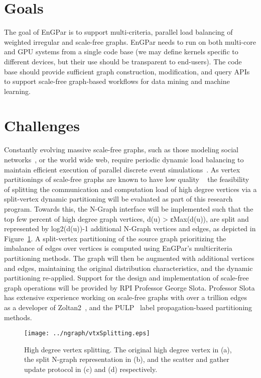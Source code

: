 \documentclass{article}
\begin{document}
\section{Goals}

The goal of EnGPar is to support multi-criteria, parallel
load balancing of weighted irregular and scale-free graphs.
EnGPar needs to run on both multi-core and GPU systems from a single code base
(we may define kernels specific to different devices, but their use should be
transparent to end-users).
The code base should provide sufficient graph construction, modification, and
query APIs to support scale-free graph-based workflows for data mining and
machine learning.

\section{Challenges}

Constantly evolving massive scale-free graphs, such as those modeling social
networks~\cite{twitter2010,kwak2010twitter}, or the world wide web, require
periodic dynamic load balancing to maintain efficient execution of parallel
discrete event simulations~\cite{carothers2002ross}.
As vertex partitionings of scale-free graphs are known to have low quality
~\cite{abou2006multilevel,lang2004finding,leskovec2009community,pienta2013parallel}
the feasibility of splitting the communication and computation load of high
degree vertices via a split-vertex dynamic partitioning will be evaluated as
part of this research program.
Towards this, the N-Graph interface will be implemented such
that the top few percent of high degree graph vertices, d(u) > εMax(d(u)), are
split and represented by log2(d(u))-1 additional N-Graph vertices and edges, as
depicted in Figure~\ref{fig:vtxSplitting}.
A split-vertex partitioning of the source graph prioritizing the imbalance of
edges over vertices is computed using EnGPar’s multicriteria partitioning
methods.
The graph will then be augmented with additional vertices and edges,
maintaining the original distribution characteristics, and the dynamic
partitioning re-applied.
Support for the design and implementation of scale-free graph operations will be
provided by RPI Professor George Slota.
Professor Slota has extensive experience working on scale-free graphs with over
a trillion edges~\cite{slota_ipdps2017} as a developer of Zoltan2~\cite{zoltan2}, and the
PULP~\cite{slota_ipdps2017} label propagation-based partitioning methods.

\begin{figure}
  \texttt{[image: ../ngraph/vtxSplitting.eps]}
  \caption{\label{fig:vtxSplitting}
    High degree vertex splitting. 
    The original high degree vertex in (a), the split N-graph representation in
    (b), and the scatter and gather update protocol in (c) and (d) respectively.
  }
\end{figure}
\end{document}
